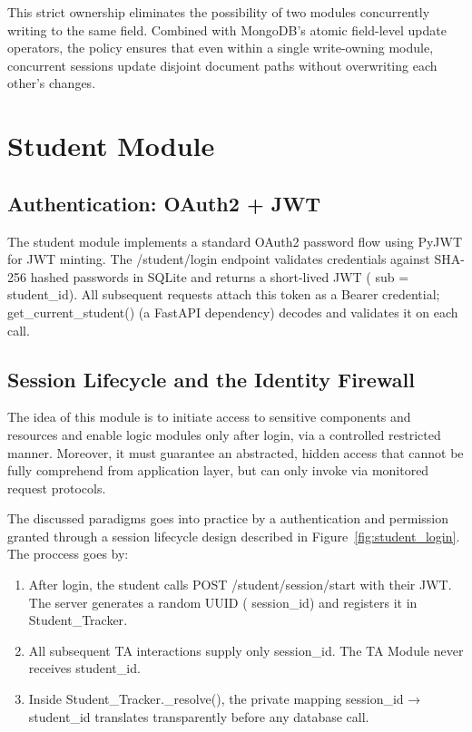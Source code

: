 This strict ownership eliminates the possibility of two modules concurrently writing to the same field. Combined with MongoDB's 
atomic field-level update operators, the policy ensures that even within a single write-owning module, concurrent sessions 
update disjoint document paths without overwriting each other's changes.


\section{Student Module}

\subsection{Authentication: OAuth2 + JWT}

The student module implements a standard OAuth2 password flow using  {PyJWT} for JWT minting. The  {/student/login} endpoint 
validates credentials against SHA-256 hashed passwords in SQLite and returns a short-lived JWT ( {sub} =  {student\_id}). All 
subsequent requests attach this token as a Bearer credential;  {get\_current\_student()} (a FastAPI dependency) decodes and 
validates it on each call.

\subsection{Session Lifecycle and the Identity Firewall}\label{sec:firewall}

The idea of this module is to initiate access to sensitive components and resources and enable logic modules only after login, via a controlled restricted manner. 
Moreover, it must guarantee an abstracted, hidden access that cannot be fully comprehend from application layer, but can only invoke via monitored request protocols.

The discussed paradigms goes into practice by a authentication and permission granted through a session lifecycle design described in Figure~\ref{fig:student_login}. The 
proccess goes by:
\begin{enumerate}
  \item After login, the student calls  {POST /student/session/start} with their JWT. The server generates a random UUID ( {session\_id}) and registers it in  {Student\_Tracker}.
  \item All subsequent TA interactions supply only  {session\_id}. The TA Module never receives  {student\_id}.
  \item Inside  {Student\_Tracker.\_resolve()}, the private mapping  {session\_id → student\_id} translates transparently before any database call.
\end{enumerate}


